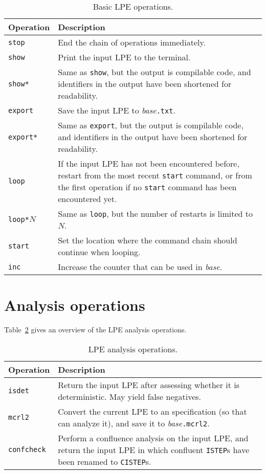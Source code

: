 \begin{table}[!ht]
\begin{center}
\begin{tabularx}{\linewidth}{l|X|}
\textbf{Operation} & \textbf{Description} \\ \hline
\texttt{stop} & End the chain of operations immediately. \\ \hline
\texttt{show} & Print the input LPE to the terminal. \\ \hline
\texttt{show*} & Same as \texttt{show}, but the output is compilable \txs{} code, and identifiers in the output have been shortened for readability. \\ \hline
\texttt{export} & Save the input LPE to \textit{base}\texttt{.txt}. \\ \hline
\texttt{export*} & Same as \texttt{export}, but the output is compilable \txs{} code, and identifiers in the output have been shortened for readability. \\ \hline
\texttt{loop} & If the input LPE has not been encountered before, restart from the most recent \texttt{start} command, or from the first operation if no \texttt{start} command has been encountered yet. \\ \hline
\texttt{loop*}$N$ & Same as \texttt{loop}, but the number of restarts is limited to $N$. \\ \hline
\texttt{start} & Set the location where the command chain should continue when looping. \\ \hline
\texttt{inc} & Increase the counter that can be used in \textit{base}. \\ \hline
\end{tabularx}
\caption{Basic LPE operations.}
\label{basiclpeops:table}
\end{center}
\end{table}

\section{Analysis operations}

Table~\ref{lpeanalysisops:table} gives an overview of the LPE analysis operations.

\begin{table}[!ht]
\begin{center}
\begin{tabularx}{\linewidth}{l|X|}
\textbf{Operation} & \textbf{Description} \\ \hline
\texttt{isdet} & Return the input LPE after assessing whether it is deterministic. May yield false negatives. \\ \hline
\texttt{mcrl2} & Convert the current LPE to an \mcrl{} specification (so that \mcrl{} can analyze it), and save it to \textit{base}\texttt{.mcrl2}. \\ \hline
\texttt{confcheck} & Perform a confluence analysis on the input LPE, and return the input LPE in which confluent \texttt{ISTEP}s have been renamed to \texttt{CISTEP}s. \\ \hline
\end{tabularx}
\caption{LPE analysis operations.}
\label{lpeanalysisops:table}
\end{center}
\end{table}

